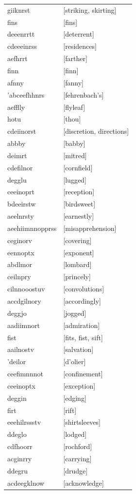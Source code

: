\documentclass{article}
\begin{document}
\begin{tabular}{ll}
giiknrst & [striking, skirting] \\
fins & [fins] \\
deeenrrtt & [deterrent] \\
cdeeeinrss & [residences] \\
aefhrrt & [farther] \\
finn & [finn] \\
afnny & [fanny] \\
'abceefhhnrs & [fehrenbach's] \\
aefflly & [flyleaf] \\
hotu & [thou] \\
cdeiinorst & [discretion, directions] \\
abbby & [babby] \\
deimrt & [mitred] \\
cdefilnor & [cornfield] \\
degglu & [lugged] \\
ceeinoprt & [reception] \\
bdeeirstw & [birdsweet] \\
aeelnrsty & [earnestly] \\
aeehiimnnopprss & [misapprehension] \\
ceginorv & [covering] \\
eennoptx & [exponent] \\
abdlmor & [lombard] \\
ceilnpry & [princely] \\
cilnnooostuv & [convolutions] \\
accdgilnory & [accordingly] \\
deggjo & [jogged] \\
aadiimnort & [admiration] \\
fist & [fits, fist, sift] \\
aailnostv & [salvation] \\
'deilor & [d'olier] \\
ceefimnnnot & [confinement] \\
ceeinoptx & [exception] \\
deggin & [edging] \\
firt & [rift] \\
eeehilrssstv & [shirtsleeves] \\
ddeglo & [lodged] \\
cdfhoorr & [rochford] \\
acginrry & [carrying] \\
ddegru & [drudge] \\
acdeegklnow & [acknowledge] \\

\end{tabular}
\end{document}
